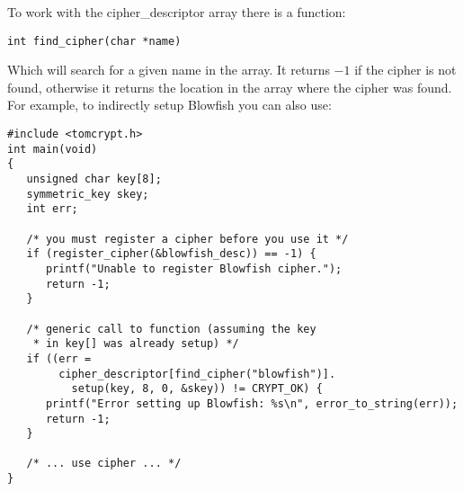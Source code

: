 \documentclass[synpaper]{book}
\begin{document}
To work with the cipher\_descriptor array there is a function:
\begin{verbatim}
int find_cipher(char *name)
\end{verbatim}
Which will search for a given name in the array.  It returns $-1$ if the cipher is not found, otherwise it returns
the location in the array where the cipher was found.  For example, to indirectly setup Blowfish you can also use:
\begin{small}
  
\begin{verbatim}
#include <tomcrypt.h>
int main(void)
{
   unsigned char key[8];
   symmetric_key skey;
   int err;

   /* you must register a cipher before you use it */
   if (register_cipher(&blowfish_desc)) == -1) {
      printf("Unable to register Blowfish cipher.");
      return -1;
   }

   /* generic call to function (assuming the key
    * in key[] was already setup) */
   if ((err =
        cipher_descriptor[find_cipher("blowfish")].
          setup(key, 8, 0, &skey)) != CRYPT_OK) {
      printf("Error setting up Blowfish: %s\n", error_to_string(err));
      return -1;
   }

   /* ... use cipher ... */
}
\end{verbatim}
\end{small}
\end{document}
